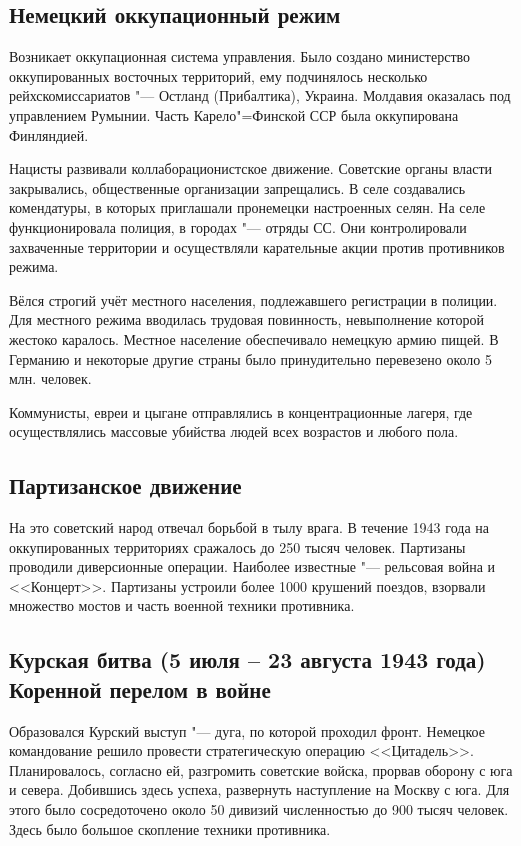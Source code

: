 \subsection{Немецкий оккупационный режим}

Возникает оккупационная система управления. Было создано министерство оккупированных восточных территорий, ему подчинялось несколько рейхскомиссариатов "--- Остланд (Прибалтика), Украина. Молдавия оказалась под управлением Румынии. Часть Карело"=Финской ССР была оккупирована Финляндией.

Нацисты развивали коллаборационистское движение. Советские органы власти закрывались, общественные организации запрещались. В селе создавались комендатуры, в которых приглашали пронемецки настроенных селян. На селе функционировала полиция, в городах "--- отряды СС. Они контролировали захваченные территории и осуществляли карательные акции против противников режима.

Вёлся строгий учёт местного населения, подлежавшего регистрации в полиции. Для местного режима вводилась трудовая повинность, невыполнение которой жестоко каралось. Местное население обеспечивало немецкую армию пищей. В Германию и некоторые другие страны было принудительно перевезено около 5 млн. человек.

Коммунисты, евреи и цыгане отправлялись в концентрационные лагеря, где осуществлялись массовые убийства людей всех возрастов и любого пола.

\subsection{Партизанское движение}

На это советский народ отвечал борьбой в тылу врага. В течение 1943 года на оккупированных территориях сражалось до 250 тысяч человек. Партизаны проводили диверсионные операции. Наиболее известные "--- рельсовая война и <<Концерт>>. Партизаны устроили более 1000 крушений поездов, взорвали множество мостов и часть военной техники противника.

\subsection{Курская битва (5 июля -- 23 августа 1943 года) Коренной перелом в войне}

Образовался Курский выступ "--- дуга, по которой проходил фронт. Немецкое командование решило провести стратегическую операцию <<Цитадель>>. Планировалось, согласно ей, разгромить советские войска, прорвав оборону с юга и севера. Добившись здесь успеха, развернуть наступление на Москву с юга. Для этого было сосредоточено около 50 дивизий численностью до 900 тысяч человек. Здесь было большое скопление техники противника.

